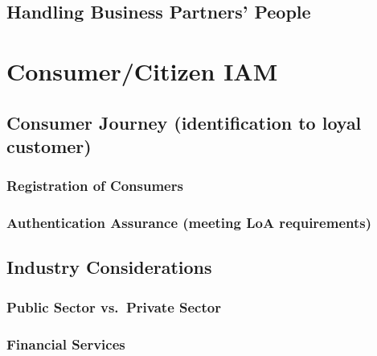 \hypertarget{handling-business-partners-people}{%
\section{Handling Business Partners'
People}\label{handling-business-partners-people}}

\hypertarget{consumercitizen-iam-1}{%
\chapter{Consumer/Citizen IAM}\label{consumercitizen-iam-1}}

\hypertarget{consumer-journey-identification-to-loyal-customer}{%
\section{Consumer Journey (identification to loyal
customer)}\label{consumer-journey-identification-to-loyal-customer}}

\hypertarget{registration-of-consumers}{%
\subsection{Registration of
Consumers}\label{registration-of-consumers}}

\hypertarget{authentication-assurance-meeting-loa-requirements}{%
\subsection{Authentication Assurance (meeting LoA
requirements)}\label{authentication-assurance-meeting-loa-requirements}}

\hypertarget{industry-considerations}{%
\section{Industry Considerations}\label{industry-considerations}}

\hypertarget{public-sector-vs.-private-sector}{%
\subsection{Public Sector vs.~Private
Sector}\label{public-sector-vs.-private-sector}}

\hypertarget{financial-services}{%
\subsection{Financial Services}\label{financial-services}}

